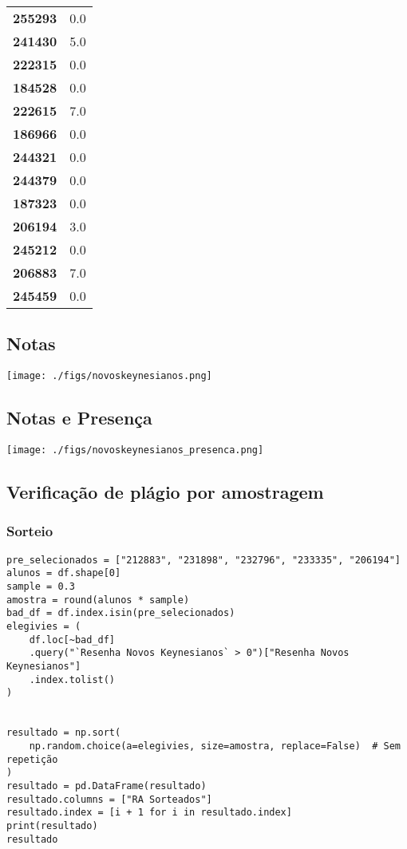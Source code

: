 \documentclass[11pt]{article}
\begin{document}
\begin{center}
\begin{longtable}{lr}
\textbf{255293} &                        0.0 \\
\textbf{241430} &                        5.0 \\
\textbf{222315} &                        0.0 \\
\textbf{184528} &                        0.0 \\
\textbf{222615} &                        7.0 \\
\textbf{186966} &                        0.0 \\
\textbf{244321} &                        0.0 \\
\textbf{244379} &                        0.0 \\
\textbf{187323} &                        0.0 \\
\textbf{206194} &                        3.0 \\
\textbf{245212} &                        0.0 \\
\textbf{206883} &                        7.0 \\
\textbf{245459} &                        0.0 \\
\end{longtable}
\end{center}
\subsection{Notas}
\label{sec:orgda6b48c}
\begin{center}
\texttt{[image: ./figs/novoskeynesianos.png]}
\end{center}

\subsection{Notas e Presença}
\label{sec:org26e9cde}
\begin{center}
\texttt{[image: ./figs/novoskeynesianos\_presenca.png]}
\end{center}
\subsection{Verificação de plágio por amostragem}
\label{sec:org36ddb2f}
\subsubsection{Sorteio}
\label{sec:org2302dae}

\begin{verbatim}
pre_selecionados = ["212883", "231898", "232796", "233335", "206194"]
alunos = df.shape[0]
sample = 0.3
amostra = round(alunos * sample)
bad_df = df.index.isin(pre_selecionados)
elegivies = (
    df.loc[~bad_df]
    .query("`Resenha Novos Keynesianos` > 0")["Resenha Novos Keynesianos"]
    .index.tolist()
)


resultado = np.sort(
    np.random.choice(a=elegivies, size=amostra, replace=False)  # Sem repetição
)
resultado = pd.DataFrame(resultado)
resultado.columns = ["RA Sorteados"]
resultado.index = [i + 1 for i in resultado.index]
print(resultado)
resultado
\end{verbatim}
\end{document}
